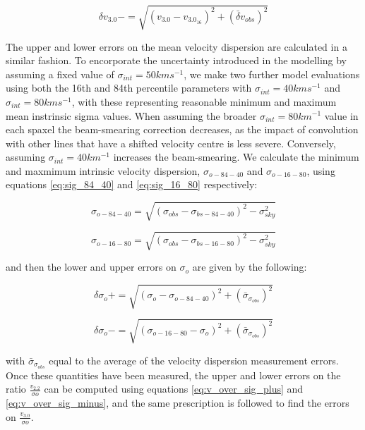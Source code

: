 \documentclass[fleqn,usenatbib]{mn2e}
\begin{document}
\begin{equation}\label{eq:v3.0_minus}
   \delta v_{3.0}- = \sqrt{(v_{3.0} - v_{3.0_{16}})^{2}  + (\bar{\delta}v_{obs})^{2}}
\end{equation}

The upper and lower errors on the mean velocity dispersion are calculated in a similar fashion.
To encorporate the uncertainty introduced in the modelling by assuming a fixed value of $\sigma_{int}=50kms^{-1}$, we make two further model evaluations using both the 16th and 84th percentile parameters with $\sigma_{int} = 40kms^{-1}$ and $\sigma_{int} = 80kms^{-1}$, with these representing reasonable minimum and maximum mean instrinsic sigma values.
When assuming the broader $\sigma_{int} = 80km^{-1}$ value in each spaxel the beam-smearing correction decreases, as the impact of convolution with other lines that have a shifted velocity centre is less severe.
Conversely, assuming $\sigma_{int} = 40km^{-1}$ increases the beam-smearing.
We calculate the minimum and maxmimum intrinsic velocity dispersion, $\sigma_{o-84-40}$ and $\sigma_{o-16-80}$, using equations \ref{eq:sig_84_40} and \ref{eq:sig_16_80} respectively:

\begin{equation}\label{eq:sig_84_40}
   \sigma_{o-84-40} = \sqrt{(\sigma_{obs} - \sigma_{bs-84-40})^{2} - \sigma_{sky}^{2}}
\end{equation}

\begin{equation}\label{eq:sig_16_80}
   \sigma_{o-16-80} = \sqrt{(\sigma_{obs} - \sigma_{bs-16-80})^{2} - \sigma_{sky}^{2}}
\end{equation}

and then the lower and upper errors on $\sigma_{o}$ are given by the following:

\begin{equation}\label{eq:sig_plus_error}
   \delta\sigma_{o}+ = \sqrt{(\sigma_{o} - \sigma_{o-84-40})^{2} + (\bar{\sigma}_{\sigma_{obs}})^{2}}
\end{equation}

\begin{equation}\label{eq:sig_minus_error}
   \delta\sigma_{o}- = \sqrt{(\sigma_{o-16-80} - \sigma_{o})^{2} + (\bar{\sigma}_{\sigma_{obs}})^{2}}
\end{equation}

with $\bar{\sigma}_{\sigma_{obs}}$ equal to the average of the velocity dispersion measurement errors.
Once these quantities have been measured, the upper and lower errors on the ratio $\frac{v_{2.2}}{\sigma{o}}$ can be computed using equations \ref{eq:v_over_sig_plus} and \ref{eq:v_over_sig_minus}, and the same prescription is followed to find the errors on $\frac{v_{3.0}}{\sigma{o}}$.
\end{document}
